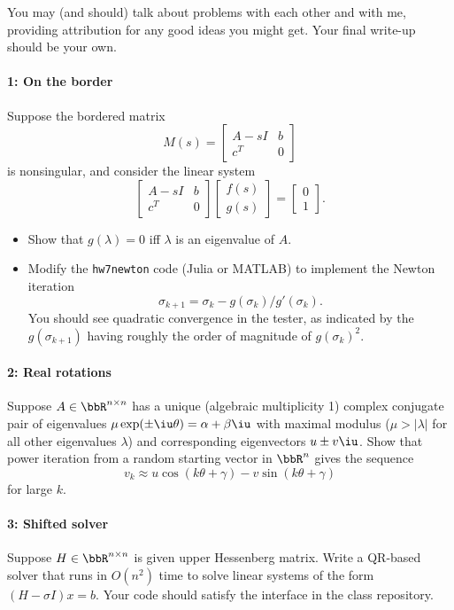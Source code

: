 \documentclass[12pt, leqno]{article} %
\begin{document}

You may (and should) talk about problems with each other and with me,
providing attribution for any good ideas you might get.  Your final
write-up should be your own.


\paragraph*{1: On the border}
Suppose the bordered matrix
\[
  M(s) =
  \begin{bmatrix}
    A-s I & b \\
    c^T & 0
  \end{bmatrix}
\]
is nonsingular, and consider the linear system
\[
  \begin{bmatrix} A-s I & b \\ c^T & 0 \end{bmatrix}
  \begin{bmatrix} f(s) \\ g(s) \end{bmatrix} =
  \begin{bmatrix} 0 \\ 1 \end{bmatrix}.
\]
\begin{itemize}
\item
  Show that $g(\lambda) = 0$ iff $\lambda$ is an eigenvalue of $A$.
\item
  Modify the {\tt hw7newton} code (Julia or MATLAB) to implement the
  Newton iteration
  \[
  \sigma_{k+1} = \sigma_k - g(\sigma_k)/g'(\sigma_k).
  \]
  You should see quadratic convergence in the tester, as indicated by
  the $g(\sigma_{k+1})$ having roughly the order of magnitude
  of $g(\sigma_k)^2$.
\end{itemize}

\paragraph*{2: Real rotations}
Suppose $A \in \bbR^{n \times n}$ has a unique (algebraic multiplicity 1)
complex conjugate pair of eigenvalues $\mu \exp(\pm \iu \theta) = \alpha + \beta \iu$ with maximal
modulus ($\mu > |\lambda|$ for all other eigenvalues $\lambda$) and
corresponding eigenvectors $u \pm v \iu$.  Show that power iteration
from a random starting vector in $\bbR^n$ gives the sequence
\[
  v_k \approx u \cos(k\theta + \gamma) - v \sin(k\theta+\gamma)
\]
for large $k$.

\paragraph*{3: Shifted solver}
Suppose $H \in \bbR^{n \times n}$ is given upper Hessenberg matrix.
Write a QR-based solver that runs in $O(n^2)$ time to solve linear
systems of the form $(H-\sigma I) x = b$.
Your code should satisfy the interface in the class repository.
\end{document}
